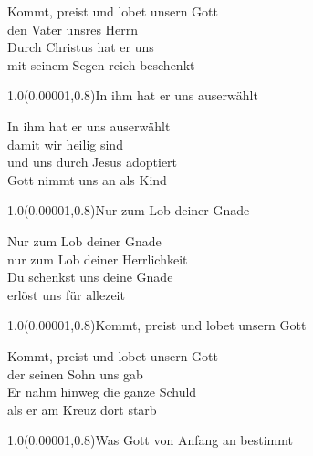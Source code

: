 \documentclass[aspectratio=169]{beamer}
\begin{document}
\color{white}
\begin{frame}
\centering
\color{white}
\huge{Kommt, preist und lobet unsern Gott} \\
\huge{den Vater unsres Herrn} \\
\huge{Durch Christus hat er uns} \\
\huge{mit seinem Segen reich beschenkt} \\

\begin{textblock}{1.0}(0.00001,0.8)\color{gray}\normalsize{In ihm hat er uns auserwählt}\end{textblock}
\end{frame}

\begin{frame}
\centering
\color{white}
\huge{In ihm hat er uns auserwählt} \\
\huge{damit wir heilig sind} \\
\huge{und uns durch Jesus adoptiert} \\
\huge{Gott nimmt uns an als Kind} \\

\begin{textblock}{1.0}(0.00001,0.8)\color{gray}\normalsize{Nur zum Lob deiner Gnade}\end{textblock}
\end{frame}

\begin{frame}
\centering
\color{white}
\huge{Nur zum Lob deiner Gnade} \\
\huge{nur zum Lob deiner Herrlichkeit} \\
\huge{Du schenkst uns deine Gnade} \\
\huge{erlöst uns für allezeit} \\

\begin{textblock}{1.0}(0.00001,0.8)\color{gray}\normalsize{Kommt, preist und lobet unsern Gott}\end{textblock}
\end{frame}

\begin{frame}
\centering
\color{white}
\huge{Kommt, preist und lobet unsern Gott} \\
\huge{der seinen Sohn uns gab} \\
\huge{Er nahm hinweg die ganze Schuld} \\
\huge{als er am Kreuz dort starb} \\

\begin{textblock}{1.0}(0.00001,0.8)\color{gray}\normalsize{Was Gott von Anfang an bestimmt}\end{textblock}
\end{frame}
\end{document}
